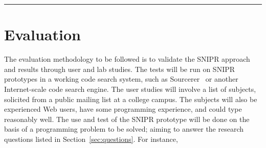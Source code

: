 \fancybreak{\pfbreakdisplay}

\section{Evaluation}
\label{sec:evaluate}

The evaluation methodology to be followed is to validate the \uppercase{SnipR} approach and results through user and lab studies. The tests will be run on \uppercase{SnipR} prototypes in a working code search system, such as Sourcerer~\cite{Bajracharya:2006vn} or another Internet-scale code search engine. The user studies will involve a list of subjects, solicited from a public mailing list at a college campus. The subjects will also be experienced Web users, have some programming experience, and could type reasonably well. The use and test of the \uppercase{SnipR} prototype will be done on the basis of a programming problem to be solved; aiming to answer the research questions listed in Section~\ref{sec:questions}. For instance,


